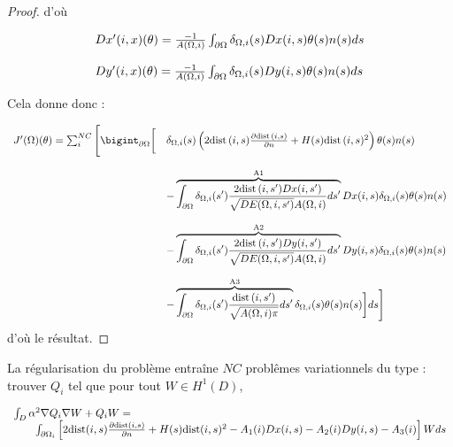 \documentclass[11pt,a4paper]{article}
\begin{document}
\begin{proof}
	d'où
	
	\begin{equation}
	\begin{array}{l}
		Dx'(i,x)(\theta)=\frac{-1}{A(\Omega,i)}\int_{\partial\Omega}\delta_{\Omega,i}(s)Dx(i,s)\theta(s)n(s)ds\\
		\\
		Dy'(i,x)(\theta)=\frac{-1}{A(\Omega,i)}\int_{\partial\Omega}\delta_{\Omega,i}(s)Dy(i,s)\theta(s)n(s)ds\\
	\end{array}
	\end{equation}
	
	Cela donne donc :
	
	\begin{equation}
	\begin{array}{ll}
	J'(\Omega)(\theta)=\sum_{i}^{NC}\Bigg[\bigintpO\bigg[ &\delta_{\Omega,i}(s)\left(2\dist(i,s)\frac{\partial\dist(i,s)}{\partial n}+H(s)\dist(i,s)^2\right)\theta(s)n(s)\\
	\\
	\,&-\overbrace{\intpO \delta_{\Omega,i}(s')\frac{2\dist(i,s')Dx(i,s')}{\sqrt{DE(\Omega,i,s')}A(\Omega,i)}ds'}^\text{A1} Dx(i,s)\delta_{\Omega,i}(s)\theta(s)n(s) \\
	\\
	\, & -\overbrace{\intpO \delta_{\Omega,i}(s')\frac{2\dist(i,s')Dy(i,s')}{\sqrt{DE(\Omega,i,s')}A(\Omega,i)}ds'}^\text{A2} Dy(i,s)\delta_{\Omega,i}(s)\theta(s)n(s)\\
	\\
	\, & -\overbrace{\intpO \delta_{\Omega,i}(s')\frac{\dist(i,s')}{\sqrt{A(\Omega,i)\pi}}ds'}^\text{A3} \delta_{\Omega,i}(s) \theta(s)n(s)\bigg]ds \Bigg]
	\end{array}
	\end{equation}
	 d'où le résultat.
\end{proof}



La régularisation du problème entraîne $NC$ problêmes variationnels du type : trouver $Q_i$ tel que pour tout $W\in H^1(D)$,

\begin{equation}
\begin{array}{l}
\int_D \alpha^2\nabla Q_i\nabla W+Q_iW=\\
\qquad\int_{\partial\Omega_{i}}\left[2\textrm{dist}(i,s)\frac{\partial\textrm{dist}(i,s)}{\partial n}+H(s)\textrm{dist}(i,s)^2-A_1(i)Dx(i,s)-A_2(i)Dy(i,s)-A_3(i)\right]Wds
\end{array}
\end{equation}
\end{document}
